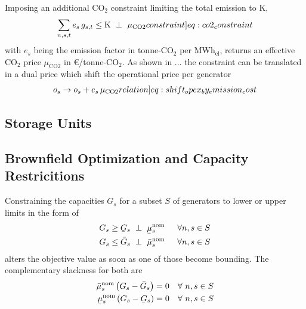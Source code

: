 \documentclass[11pt,twocolumn]{article}
\newcommand{\ubar}[1]{\underaccent{\bar}{#1}}
\newcommand{\hpad}{\hspace{15pt}}
\newcommand{\resultsin}[1]{\hspace{6pt} \bot  \hspace{6pt} #1}
\newcommand{\Forall}[1]{\hspace{10pt} \forall \,\, #1 }
\newcommand{\generation}{g_{s,t}}
\newcommand{\capacitygeneration}{G_{s}}
\newcommand{\capacitygenerationupper}{\bar{G}_{s}}
\newcommand{\capacitygenerationlower}{\ubar{G}_{s}}
\newcommand{\capitalpricegeneration}{c_{s}}
\newcommand{\operationalpricegeneration}{o_{s}}
\newcommand{\muuppergenerationnom}{\bar{\mu}^\text{nom}_{s}}
\newcommand{\mulowergenerationnom}{\ubar{\mu}^\text{nom}_{s}}
\newcommand{\lmp}[1][n]{\lambda_{#1,t}}
\newcommand{\emission}{e_{s}}
\newcommand{\emissionprice}{\mu_{\text{CO2}}}
\newcommand{\megawatthour}{MWh$_\text{el}$}
\begin{document}
Imposing an additional CO$_2$ constraint limiting the total emission to K,  
\begin{align}
\sum_{n,s,t} \emission \, \generation \le \text{K} \resultsin{\emissionprice} 
\label[constraint]{eq:co2_constraint}
\end{align}
with $\emission$ being the emission factor in tonne-CO$_2$ per \megawatthour, returns an effective CO$_2$ price $\emissionprice$ in \euro/tonne-CO$_2$. 
% 
As shown in ... the constraint can be translated in a dual price which shift the operational price per generator
\begin{align}
\operationalpricegeneration \rightarrow \operationalpricegeneration + \emission \, \emissionprice \label[relation]{eq:shift_opex_by_emission_cost}
\end{align}

\subsection{Storage Units}



\subsection{Brownfield Optimization and Capacity Restricitions}

Constraining the capacities $\capacitygeneration$  for a subset $S$ of generators to lower or upper limits in the form of
\begin{align}
\capacitygeneration \ge \capacitygenerationlower \resultsin{\mulowergenerationnom} \hpad \forall{n,s \in S} \label{eq:capacityexpansionminimum}\\
\capacitygeneration \le \capacitygenerationupper \resultsin{\muuppergenerationnom} \hpad \forall{n,s \in S}
\label{eq:capacityexpansionmaximum}
\end{align}
alters the objective value as soon as one of those become bounding. 
The complementary slackness for both are 
\begin{align}
    \muuppergenerationnom \left( \capacitygeneration - \capacitygenerationupper \right) =0 \Forall{n,s \in S} \\
    \mulowergenerationnom \left( \capacitygeneration - \capacitygenerationlower \right) =0 \Forall{n,s \in S}
\end{align}
\end{document}
